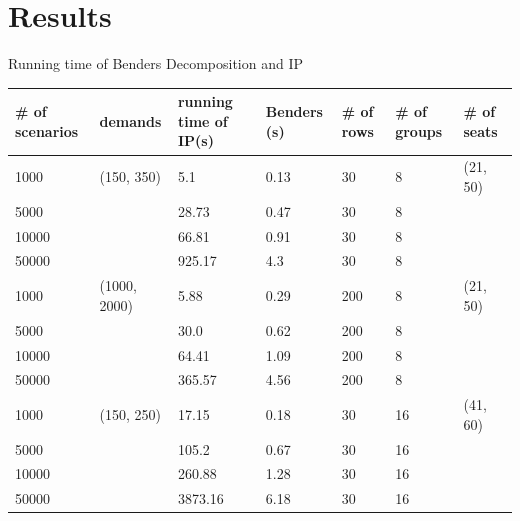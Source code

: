 
\section{Results}
    \frame{\sectionpage}

    \begin{frame}{Running time of Benders Decomposition and IP}
        \scriptsize
        \begin{table}[ht]
            \centering
            \begin{tabular}{|l|l|l|l|l|l|l|}
            \hline
            \# of scenarios & demands & running time of IP(s) & Benders (s) & \# of rows & \# of groups & \# of seats\\
            \hline
            1000  & (150, 350) & 5.1  & 0.13 & 30 & 8 & (21, 50)\\
            5000  & & 28.73 & 0.47 & 30 & 8 \\
            10000 & & 66.81  & 0.91 & 30 & 8 \\
            50000 & & 925.17 & 4.3 & 30 & 8 \\
            \hline
            1000  & (1000, 2000) & 5.88 & 0.29 & 200 & 8 & (21, 50)\\
            5000  & & 30.0 & 0.62 & 200 & 8 \\
            10000 & & 64.41 & 1.09 & 200 & 8 \\
            50000 & & 365.57 & 4.56 & 200 & 8 \\
            \hline
            1000  & (150, 250) & 17.15  & 0.18 & 30 & 16 & (41, 60) \\
            5000  & & 105.2  & 0.67 & 30 & 16  \\
            10000 & & 260.88 & 1.28 & 30 & 16  \\
            50000 & & 3873.16 & 6.18 & 30 & 16  \\
            \hline
            \end{tabular}
          \end{table}
    \end{frame}
      
